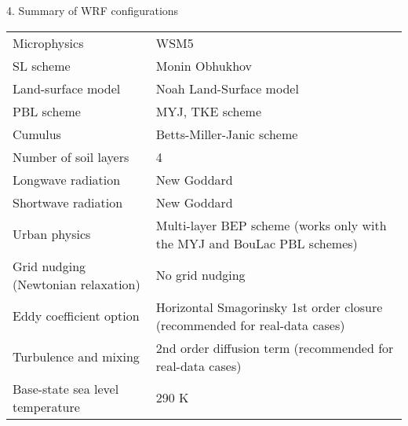 \documentclass[xcolor=table]{beamer}
\begin{document}
\begin{frame}[fragile, allowframebreaks=.9, t]{4. Summary of WRF configurations}
\begin{longtable}{ p{4.1cm}  |  p{7.9cm}}
	Microphysics                        	& WSM5                                                                       \\
	SL scheme                           	& Monin Obhukhov                                                       \\
	Land-surface model                  & Noah Land-Surface model                                 \\
	PBL scheme                          	& MYJ, TKE scheme                                                    \\
	Cumulus                             		& Betts-Miller-Janic scheme                                                  \\
	Number of soil layers               & 4                                                                          \\
	Longwave radiation                  & New Goddard                                                                \\
	Shortwave radiation                 & New Goddard                                                                \\
	Urban physics                       	& Multi-layer BEP scheme (works only with the MYJ and BouLac PBL schemes)    \\
	Grid nudging (Newtonian relaxation) & No grid nudging                                                            \\
	Eddy coefficient option             & Horizontal Smagorinsky 1st order closure (recommended for real-data cases) \\
	Turbulence and mixing               & 2nd order diffusion term (recommended for real-data cases)                 \\
	Base-state sea level temperature    & 290 K  \\
	\hline
\end{longtable}
\end{frame}
\end{document}
